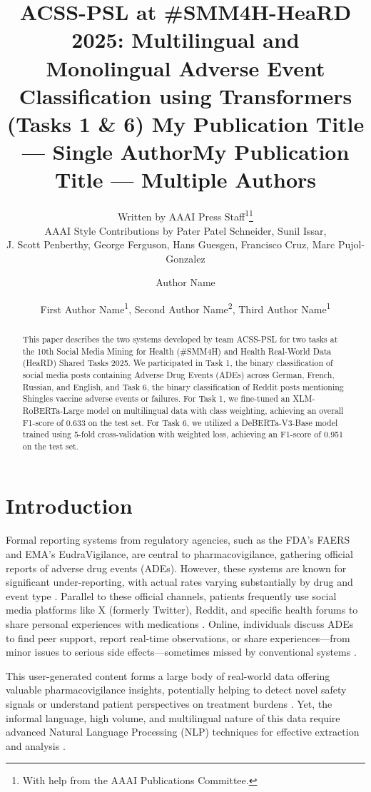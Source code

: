\documentclass[letterpaper]{article} %
\title{ACSS-PSL at \#SMM4H-HeaRD 2025: Multilingual and Monolingual Adverse Event Classification using Transformers (Tasks 1 \& 6) }
\author{
    Written by AAAI Press Staff\textsuperscript{\rm 1}\thanks{With help from the AAAI Publications Committee.}\\
    AAAI Style Contributions by Pater Patel Schneider,
    Sunil Issar,\\
    J. Scott Penberthy,
    George Ferguson,
    Hans Guesgen,
    Francisco Cruz\equalcontrib,
    Marc Pujol-Gonzalez\equalcontrib
}
\title{My Publication Title --- Single Author}
\author {
    Author Name
}
\title{My Publication Title --- Multiple Authors}
\author {
    First Author Name\textsuperscript{\rm 1},
    Second Author Name\textsuperscript{\rm 2},
    Third Author Name\textsuperscript{\rm 1}
}
\begin{document}
\maketitle

\begin{abstract}
This paper describes the two systems developed by team ACSS-PSL for two tasks at the 10th Social Media Mining for Health (\#SMM4H) and Health Real-World Data (HeaRD) Shared Tasks 2025.
We participated in Task 1, the binary classification of social media posts containing Adverse Drug Events (ADEs) across German, French, Russian, and English, and Task 6, the binary classification of Reddit posts mentioning Shingles vaccine adverse events or failures.
For Task 1, we fine-tuned an XLM-RoBERTa-Large model on multilingual data with class weighting, achieving an overall F1-score of 0.633 on the test set.
For Task 6, we utilized a DeBERTa-V3-Base model trained using 5-fold cross-validation with weighted loss, achieving an F1-score of 0.951 on the test set.
\end{abstract}

\section{Introduction}

Formal reporting systems from regulatory agencies, such as the FDA's FAERS and EMA's EudraVigilance, are central to pharmacovigilance, gathering official reports of adverse drug events (ADEs).
However, these systems are known for significant under-reporting, with actual rates varying substantially by drug and event type \cite{alatawi2017empirical}.
Parallel to these official channels, patients frequently use social media platforms like X (formerly Twitter), Reddit, and specific health forums to share personal experiences with medications \cite{golder2021comparative}.
Online, individuals discuss ADEs to find peer support, report real-time observations, or share experiences—from minor issues to serious side effects—sometimes missed by conventional systems \cite{golder2021comparative, zhou2020complementing, yu2022assessment}.

This user-generated content forms a large body of real-world data offering valuable pharmacovigilance insights, potentially helping to detect novel safety signals or understand patient perspectives on treatment burdens \cite{yang2014postmarketing, liu2014identifying}.
Yet, the informal language, high volume, and multilingual nature of this data require advanced Natural Language Processing (NLP) techniques for effective extraction and analysis \cite{liu2015identifying, yang2012detecting}.
\end{document}
